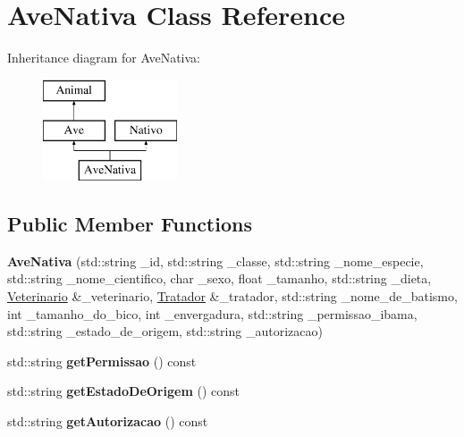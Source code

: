 \hypertarget{classAveNativa}{}\section{Ave\+Nativa Class Reference}
\label{classAveNativa}
Inheritance diagram for Ave\+Nativa\+:\begin{figure}[H]
\begin{center}
\leavevmode
\includegraphics[height=3.000000cm]{classAveNativa}
\end{center}
\end{figure}
\subsection*{Public Member Functions}
\begin{DoxyCompactItemize}
\item 
\mbox{\label{classAveNativa_abbb03ed031a100c5f8268cdfb644d0f7}} 
{\bfseries Ave\+Nativa} (std\+::string \+\_\+id, std\+::string \+\_\+classe, std\+::string \+\_\+nome\+\_\+especie, std\+::string \+\_\+nome\+\_\+cientifico, char \+\_\+sexo, float \+\_\+tamanho, std\+::string \+\_\+dieta, \hyperlink{classVeterinario}{Veterinario} \&\+\_\+veterinario, \hyperlink{classTratador}{Tratador} \&\+\_\+tratador, std\+::string \+\_\+nome\+\_\+de\+\_\+batismo, int \+\_\+tamanho\+\_\+do\+\_\+bico, int \+\_\+envergadura, std\+::string \+\_\+permissao\+\_\+ibama, std\+::string \+\_\+estado\+\_\+de\+\_\+origem, std\+::string \+\_\+autorizacao)
\item 
\mbox{\label{classAveNativa_a5946d2b5196fc4a99d33ae2be3deb40f}} 
std\+::string {\bfseries get\+Permissao} () const
\item 
\mbox{\label{classAveNativa_a83e72a38bc4c079a66617ffe2da38bd5}} 
std\+::string {\bfseries get\+Estado\+De\+Origem} () const
\item 
\mbox{\label{classAveNativa_a2e87ed537e1de4041632e67e93d7f875}} 
std\+::string {\bfseries get\+Autorizacao} () const
\end{DoxyCompactItemize}
